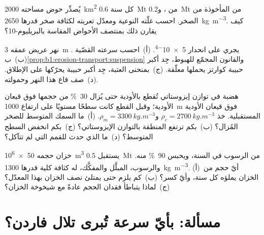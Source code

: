 \begin{exercise}[$\star\star$]\label{exo:b1:erosion-transport:9}
يُصدِّر حوض مساحته \qty{2000}{km^2} كل سنة \qty{0.6}{Mt} من  ، و\qty{0.2}{Mt} من  المأخوذة من الصخر. احسب غلّته النوعية ومعدّل تعريته لكثافة صخر قدرها \qty{2650}{kg.m^{-3}}. كيف يقارن ذلك بمنتصف الأحواض المقاسة بالبريليوم-10؟
\end{exercise}

\begin{exercise}[$\star\star\star$]\label{exo:b1:erosion-transport:10}
نهر عريض عمقه \qty{3}{m} يجري على انحدار \num{5e-4}. (أ)~احسب سرعته القصّية . (ب)~ب\cref{prop:b1:erosion-transport:suspension} والقانون المجمّع للهبوط، جِد أكبر حبيبة كوارتز يحملها معلّقة. (ج)~بمنحنى العتبة، جِد أكبر حبيبة يحرّكها على الإطلاق. (د)~صف قاع هذا النهر وحمولته.
\end{exercise}

\begin{exercise}[$\star\star\star$]\label{exo:b1:erosion-transport:11}
هضبة في توازن إيزوستاتي تُقطع بالأودية حتى يُزال \qty{30}{\percent} من حجمها فوق قيعان الأودية؛ وقبل القطع كانت سطحًا مستويًا على ارتفاع \qty{1000}{m} فوق قيعان الأودية المستقبلية. خذ $\rho_c = \qty{2700}{kg.m^{-3}}$ و$\rho_m = \qty{3300}{kg.m^{-3}}$. (أ)~ما السمك المتوسط للصخر المُزال؟ (ب)~بكم ترتفع المنطقة بالتوازن الإيزوستاتي؟ (ج)~بكم انخفض السطح المتوسط؟ (د)~ما الذي حدث للقمم التي لم تتآكل؟
\end{exercise}

\begin{exercise}[$\star\star\star$]\label{exo:b1:erosion-transport:12}
خزان حجمه \qty{50e6}{m^3} يستقبل \qty{0.5}{Mt} من الرسوب في السنة، ويحبس \qty{90}{\percent} منه. والرسوب، المبلَّل والمفكَّك، له كثافة كلية قدرها \qty{1300}{kg.m^{-3}}. (أ)~أيّ حجم من الخزان يملؤه كل سنة، وأيّ كسر؟ (ب)~كم يلزم حتى يمتلئ نصف الخزان بهذا المعدّل؟ (ج)~لماذا يتباطأ فقدان الحجم عادةً مع شيخوخة الخزان؟
\end{exercise}

\section{مسألة: بأيّ سرعة تُبرى تلال فاردن؟}

